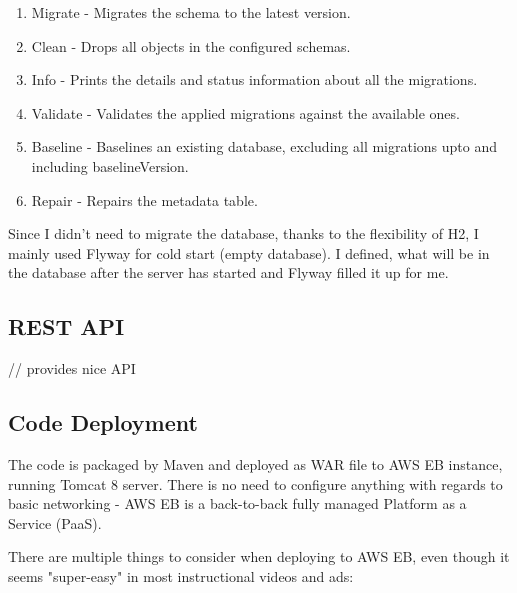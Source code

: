 \begin{enumerate}
	\item Migrate - Migrates the schema to the latest version.
	\item Clean - Drops all objects in the configured schemas.
	\item Info - Prints the details and status information about all the migrations.
	\item Validate - Validates the applied migrations against the available ones.
	\item Baseline - Baselines an existing database, excluding all migrations upto and including baselineVersion.
	\item Repair - Repairs the metadata table.
\end{enumerate}

Since I didn't need to migrate the database, thanks to the flexibility of H2, I mainly used Flyway for cold start (empty database). I defined, what will be in the database after the server has started and Flyway filled it up for me.

\subsection{REST API}

// provides nice API

\subsection{Code Deployment}

The code is packaged by Maven and deployed as WAR file to AWS EB instance, running Tomcat 8 server. There is no need to configure anything with regards to basic networking - AWS EB is a back-to-back fully managed Platform as a Service (PaaS).

There are multiple things to consider when deploying to AWS EB, even though it seems "super-easy" in most instructional videos and ads:

